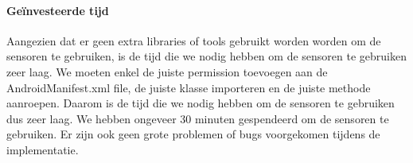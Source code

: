 \paragraph{Geïnvesteerde tijd}
Aangezien dat er geen extra libraries of tools gebruikt worden worden om de sensoren te gebruiken, 
is de tijd die we nodig hebben om de sensoren te gebruiken zeer laag. We moeten enkel de juiste 
permission toevoegen aan de AndroidManifest.xml file, de juiste klasse importeren en de juiste 
methode aanroepen. Daarom is de tijd die we nodig hebben om de sensoren te gebruiken dus zeer laag. 
We hebben ongeveer 30 minuten gespendeerd om de sensoren te gebruiken. Er zijn ook geen grote problemen of 
bugs voorgekomen tijdens de implementatie.


